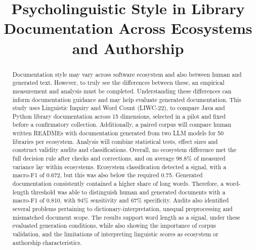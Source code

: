 \documentclass[conference]{IEEEtran}
\begin{document}
\title{Psycholinguistic Style in Library Documentation Across Ecosystems and Authorship}

\author{
\and
{}
}

\maketitle
\thispagestyle{plain}
\pagestyle{plain}

\begin{abstract}
Documentation style may vary across software ecosystem and also between human and generated text. However, to truly see the differences between these, an empirical measurement and analysis must be completed. Understanding these differences can inform documentation guidance and may help evaluate generated documentation. This study uses Linguistic Inquiry and Word Count (LIWC-22), to compare Java and Python library documentation across 15 dimensions, selected in a pilot and fixed before a confirmatory collection. Additionally, a paired corpus will compare human written READMEs with documentation generated from two LLM models for 50 libraries per ecosystem. Analysis will combine statistical tests, effect sizes and construct validity audits and classifications. Overall, no ecosystem difference met the full decision rule after checks and corrections, and on average 98.8\% of measured variance lay within ecosystems. Ecosystem classification detected a signal, with a macro-F1 of 0.672, but this was also below the required 0.75. Generated documentation consistently contained a higher share of long words. Therefore, a word-length threshold was able to distinguish human and generated documents with a macro-F1 of 0.810, with 94\% sensitivity and 67\% specificity. Audits also identified several problems pertaining to dictionary-interpretation, unequal preprocessing and mismatched document scope. The results support word length as a signal, under these evaluated generation conditions, while also showing the importance of corpus validation, and the limitations of interpreting linguistic scores as ecosystem or authorship characteristics.
\end{abstract}
\end{document}
